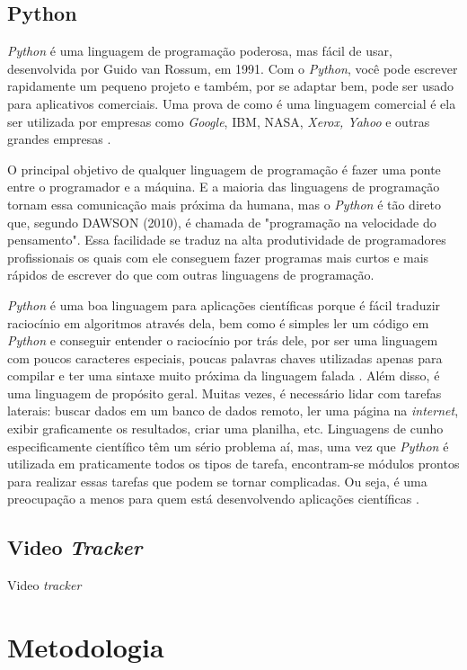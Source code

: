 \section{Python}

\textit{Python} é uma linguagem de programação poderosa, mas fácil de usar, desenvolvida por Guido van Rossum, em 1991. Com o \textit{Python}, você pode escrever rapidamente um pequeno projeto e também, por se adaptar bem, pode ser usado para aplicativos comerciais. Uma prova de como é uma linguagem comercial é ela ser utilizada por empresas como \textit{Google}, IBM, NASA, \textit{Xerox, Yahoo} e outras grandes empresas \cite{dawson2010}.

O principal objetivo de qualquer linguagem de programação é fazer uma ponte entre o programador e a máquina. E a maioria das linguagens de programação tornam essa comunicação mais próxima da humana, mas o \textit{Python} é tão direto que, segundo DAWSON (2010), é chamada de "programação na velocidade do pensamento". Essa facilidade se traduz na alta produtividade de programadores profissionais os quais com ele conseguem fazer programas mais curtos e mais rápidos de escrever do que com outras linguagens de programação. 

\textit{Python} é uma boa linguagem para aplicações científicas porque é fácil traduzir raciocínio em algoritmos através dela, bem como é simples ler um código em \textit{Python} e conseguir entender o raciocínio por trás dele, por ser uma linguagem com poucos caracteres especiais, poucas palavras chaves utilizadas apenas para compilar e ter uma sintaxe muito próxima da linguagem falada \cite{reitz2018}. Além disso, é uma linguagem de propósito geral. Muitas vezes, é necessário lidar com tarefas laterais: buscar dados em um banco de dados remoto, ler uma página na \textit{internet}, exibir graficamente os resultados, criar uma planilha, etc. Linguagens de cunho especificamente científico têm um sério problema aí, mas, uma vez que \textit{Python} é utilizada em praticamente todos os tipos de tarefa, encontram-se módulos prontos para realizar essas tarefas que podem se tornar complicadas. Ou seja, é uma preocupação a menos para quem está desenvolvendo aplicações científicas \cite{downey2012}.
  
\section {Video \textit{Tracker}}
Video \textit{tracker} \cite{onorato2012}

\chapter[Metodologia]{Metodologia}

